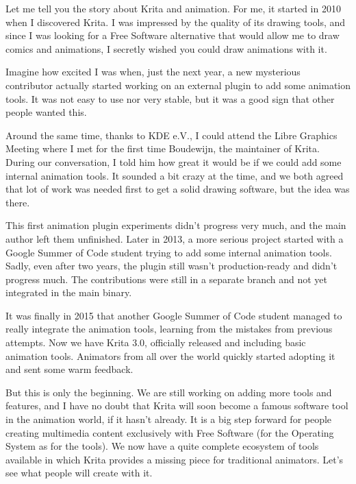 

\noindent{}Let me tell you the story about Krita and animation. For me, it started in 2010 when I discovered Krita. I was impressed by the quality of its drawing tools, and since I was looking for a Free Software alternative that would allow me to draw comics and animations, I secretly wished you could draw animations with it. 

Imagine how excited I was when, just the next year, a new mysterious contributor actually started working on an external plugin to add some animation tools. It was not easy to use nor very stable, but it was a good sign that other people wanted this. 

Around the same time, thanks to KDE e.V., I could attend the Libre Graphics Meeting where I met for the first time Boudewijn, the maintainer of Krita. During our conversation, I told him how great it would be if we could add some internal animation tools. It sounded a bit crazy at the time, and we both agreed that lot of work was needed first to get a solid drawing software, but the idea was there.

This first animation plugin experiments didn’t progress very much, and the main author left them unfinished. Later in 2013, a more serious project started with a Google Summer of Code student trying to add some internal animation tools. Sadly, even after two years, the plugin still wasn’t production-ready and didn’t progress much. The contributions were still in a separate branch and not yet integrated in the main binary.

It was finally in 2015 that another Google Summer of Code student managed to really integrate the animation tools, learning from the mistakes from previous attempts. Now we have Krita 3.0, officially released and including basic animation tools. Animators from all over the world quickly started adopting it and sent some warm feedback.

But this is only the beginning. We are still working on adding more tools and features, and I have no doubt that Krita will soon become a famous software tool in the animation world, if it hasn’t already. It is a big step forward for people creating multimedia content exclusively with Free Software (for the Operating System as for the tools). We now have a quite complete ecosystem of tools available in which Krita provides a missing piece for traditional animators. Let’s see what people will create with it.

